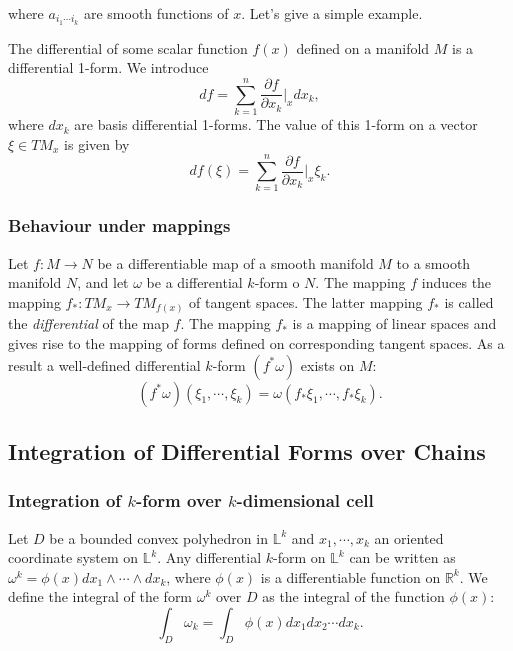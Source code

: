 where $a_{i_1\cdots i_k}$ are smooth functions of $x$. Let's give a simple
example.
\begin{example}
  The differential of some scalar function $f(x)$ defined on a manifold $M$ is
  a differential 1-form. We introduce
  \begin{equation}
    df = \sum_{k=1}^n{\frac{\partial f}{\partial x_k}\bigg\vert_x dx_k},
  \end{equation}
where $dx_k$ are basis differential 1-forms. The value of this 1-form on
a vector $\xi\in TM_x$ is given by
\begin{equation}
  df(\xi) = \sum_{k=1}^n{\frac{\partial f}{\partial x_k}\bigg\vert_x \xi_k}.
\end{equation}
\end{example}
\subsubsection{Behaviour under mappings}
Let $f:M\rightarrow N$ be a differentiable map of a smooth manifold $M$ to
a smooth manifold $N$, and let $\omega$ be a differential $k$-form o $N$. The
mapping $f$ induces the mapping $f_*:TM_x\rightarrow TM_{f(x)}$ of tangent
spaces. The latter mapping $f_*$ is called the \textit{differential} of the map
$f$. The mapping $f_*$ is a mapping of linear spaces and gives rise to the
mapping of forms defined on corresponding tangent spaces. As a result
a well-defined differential $k$-form $(f^*\omega)$ exists on $M$:
\begin{equation}
  (f^*\omega)(\xi_1,\cdots,\xi_k) = \omega(f_*\xi_1,\cdots,f_*\xi_k).
\end{equation}
\subsection{Integration of Differential Forms over Chains}
\subsubsection{Integration of $k$-form over $k$-dimensional cell}
Let $D$ be a bounded convex polyhedron in $\mathbb{L}^k$ and $x_1,\cdots,x_k$
an oriented coordinate system on $\mathbb{L}^k$. Any differential $k$-form on
$\mathbb{L}^k$ can be written as $\omega^k=\phi(x)dx_1\wedge\cdots\wedge dx_k$,
where $\phi(x)$ is a differentiable function on $\mathbb{R}^k$. We define
the integral of the form $\omega^k$ over $D$ as the integral of the function
$\phi(x)$:
\begin{equation}
  \int_D{\omega_k} = \int_D{\phi(x)dx_1dx_2\cdots dx_k}.
\end{equation}

